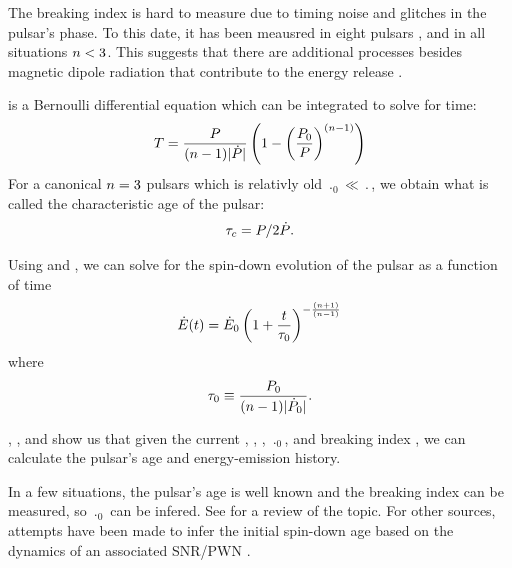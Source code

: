 The breaking index is hard to measure due to timing noise and glitches
in the pulsar's phase. To this date, it has been meausred in eight 
pulsars \citep[See][ and references therein]{espinoza_2011_braking-index},
and in all situations $n<3$. This suggests 
that there are additional processes besides magnetic
dipole radiation that contribute to the energy release
\citep{blandford_1988_interpretation-pulsar}.

 is
a Bernoulli differential equation which can be integrated to solve for time:
\begin{equation}\eqnlabel{pulsar_age}
  T = \frac{\period}{(\breakingindex-1) \absval{\perioddot}}
  \left(
  1-\left(\frac{\period_0}{\period}\right)^{(\breakingindex-1)}
  \right)
\end{equation}
For a canonical $n=3$ pulsars which is
relativly old $\period_0 \ll \period$, we obtain
what is called the characteristic age of the pulsar:
\begin{equation}
  \tau_c = P/2\dot{P}.
\end{equation}

Using  and , we can solve
for the spin-down evolution of the pulsar
as a function of time
\citep{pacini_1973_evolution-supernova}
\begin{equation}\eqnlabel{energy_dot_vs_time}
    \energydot(t) = \energydot_0
    \left(
    1 + \frac{\time}{\SpinDownTimescale}
    \right)^{-\frac{(n+1)}{(n-1)}}
\end{equation}
where
\begin{equation}
  \tau_0 \equiv \frac{P_0}{(n-1)|\dot{P}_0|}.
\end{equation}


, ,
and  show us that given the current \period,
\perioddot, \energydot, $\period_0$, and breaking index \breakingindex,
we can calculate the pulsar's age and energy-emission history.

In a few situations, the pulsar's age is well known and the breaking index can be
measured, so $\period_0$ can be infered. See \cite{kaspi_2002_constraining-birth}
for a review of the topic. For other sources, attempts have been
made to infer the initial spin-down age based on the dynamics of an
associated \ac{SNR}/\ac{PWN} \citep{van-der-swaluw_2001_inferring-initial}.

